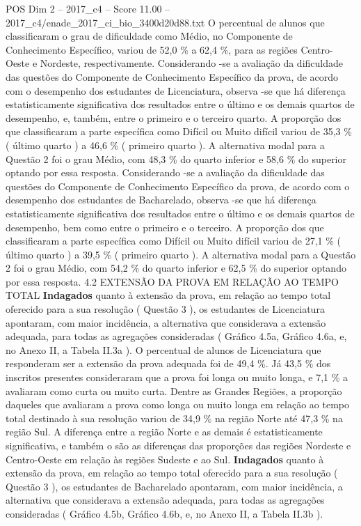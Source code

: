 \begin{textsample}{POS Dim 2 – 2017\_c4 – Score 11.00 – 2017\_c4/enade\_2017\_ci\_bio\_3400d20d88.txt}
O percentual de alunos que classificaram o grau de dificuldade como Médio, no Componente de Conhecimento Específico, variou de 52,0 \% a 62,4 \%, para as regiões Centro-Oeste e Nordeste, respectivamente.
Considerando -se a avaliação da dificuldade das questões do Componente de Conhecimento Específico da prova, de acordo com o desempenho dos estudantes de Licenciatura, observa -se que há diferença estatisticamente significativa dos resultados entre o último e os demais quartos de desempenho, e, também, entre o primeiro e o terceiro quarto.
A proporção dos que classificaram a parte específica como Difícil ou Muito difícil variou de 35,3 \% ( último quarto ) a 46,6 \% ( primeiro quarto ).
A alternativa modal para a Questão 2 foi o grau Médio, com 48,3 \% do quarto inferior e 58,6 \% do superior optando por essa resposta.
Considerando -se a avaliação da dificuldade das questões do Componente de Conhecimento Específico da prova, de acordo com o desempenho dos estudantes de Bacharelado, observa -se que há diferença estatisticamente significativa dos resultados entre o último e os demais quartos de desempenho, bem como entre o primeiro e o terceiro.
A proporção dos que classificaram a parte específica como Difícil ou Muito difícil variou de 27,1 \% ( último quarto ) a 39,5 \% ( primeiro quarto ).
A alternativa modal para a Questão 2 foi o grau Médio, com 54,2 \% do quarto inferior e 62,5 \% do superior optando por essa resposta. 4.2 EXTENSÃO DA PROVA EM RELAÇÃO AO TEMPO TOTAL \textbf{Indagados} quanto à extensão da prova, em relação ao tempo total oferecido para a sua resolução ( Questão 3 ), os estudantes de Licenciatura apontaram, com maior incidência, a alternativa que considerava a extensão adequada, para todas as agregações consideradas ( Gráfico 4.5a, Gráfico 4.6a, e, no Anexo II, a Tabela II.3a ).
O percentual de alunos de Licenciatura que responderam ser a extensão da prova adequada foi de 49,4 \%.
Já 43,5 \% dos inscritos presentes consideraram que a prova foi longa ou muito longa, e 7,1 \% a avaliaram como curta ou muito curta.
Dentre as Grandes Regiões, a proporção daqueles que avaliaram a prova como longa ou muito longa em relação ao tempo total destinado à sua resolução variou de 34,9 \% na região Norte até 47,3 \% na região Sul.
A diferença entre a região Norte e as demais é estatisticamente significativa, e também o são as diferenças das proporções das regiões Nordeste e Centro-Oeste em relação às regiões Sudeste e ao Sul. \textbf{Indagados} quanto à extensão da prova, em relação ao tempo total oferecido para a sua resolução ( Questão 3 ), os estudantes de Bacharelado apontaram, com maior incidência, a alternativa que considerava a extensão adequada, para todas as agregações consideradas ( Gráfico 4.5b, Gráfico 4.6b, e, no Anexo II, a Tabela II.3b ).

\end{textsample}
